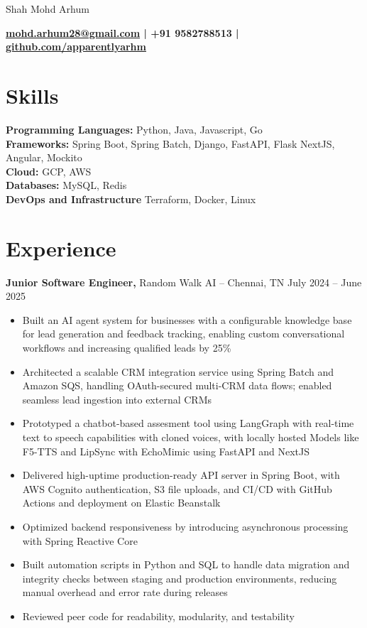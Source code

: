 \documentclass[12pt]{article}       %
\begin{document}
\centerline{\Huge Shah Mohd Arhum}

\vspace{5pt}

\centerline{\textbf{\href{mailto:mohd.arhum28@gmail.com}{mohd.arhum28@gmail.com} | +91 9582788513 | \href{https://github.com/apparentlyarhm}{github.com/apparentlyarhm}}}

\vspace{-10pt}

\section*{Skills}
\textbf{Programming Languages:} Python, Java, Javascript, Go \\
\textbf{Frameworks:} Spring Boot, Spring Batch, Django, FastAPI, Flask NextJS, Angular, Mockito \\
\textbf{Cloud:} GCP, AWS \\
\textbf{Databases:} MySQL, Redis \\
\textbf{DevOps and Infrastructure} Terraform, Docker, Linux

\vspace{-6.5pt}

\section*{Experience}
\textbf{Junior Software Engineer,} {Random Walk AI} -- Chennai, TN \hfill July 2024 -- June 2025 \\
\vspace{-9pt}
\begin{itemize}
    \item Built an AI agent system for businesses with a configurable knowledge base for lead generation and feedback tracking, enabling custom conversational workflows and increasing qualified leads by 25\%
    \item Architected a scalable CRM integration service using Spring Batch and Amazon SQS, handling OAuth-secured multi-CRM data flows; enabled seamless lead ingestion into external CRMs
    \item Prototyped a chatbot-based assesment tool using LangGraph with real-time text to speech capabilities with cloned voices, with locally hosted Models like F5-TTS and LipSync with EchoMimic using FastAPI and NextJS
    \item Delivered high-uptime production-ready API server in Spring Boot, with AWS Cognito authentication, S3 file uploads, and CI/CD with GitHub Actions and deployment on Elastic Beanstalk    \item Optimized backend responsiveness by introducing asynchronous processing with Spring Reactive Core 
    \item Built automation scripts in Python and SQL to handle data migration and integrity checks between staging and production environments, reducing manual overhead and error rate during releases
    \item Reviewed peer code for readability, modularity, and testability

\end{itemize}
\end{document}
